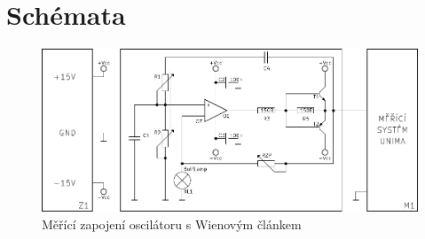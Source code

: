 \section*{Schémata}
  \begin{figure}[H]
    \centering
    \includegraphics[width=18cm]{../img/wien.pdf}
    \caption{Měřící zapojení oscilátoru s Wienovým článkem}
    \label{sch:1}
  \end{figure}
  
 
  

